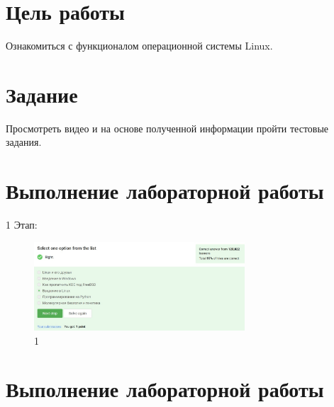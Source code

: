 \hypertarget{ux446ux435ux43bux44c-ux440ux430ux431ux43eux442ux44b}{%
\section{Цель
работы}\label{ux446ux435ux43bux44c-ux440ux430ux431ux43eux442ux44b}}

Ознакомиться с функционалом операционной системы Linux.

\hypertarget{ux437ux430ux434ux430ux43dux438ux435}{%
\section{Задание}\label{ux437ux430ux434ux430ux43dux438ux435}}

Просмотреть видео и на основе полученной информации пройти тестовые
задания.

\hypertarget{ux432ux44bux43fux43eux43bux43dux435ux43dux438ux435-ux43bux430ux431ux43eux440ux430ux442ux43eux440ux43dux43eux439-ux440ux430ux431ux43eux442ux44b}{%
\section{Выполнение лабораторной
работы}\label{ux432ux44bux43fux43eux43bux43dux435ux43dux438ux435-ux43bux430ux431ux43eux440ux430ux442ux43eux440ux43dux43eux439-ux440ux430ux431ux43eux442ux44b}}

1 Этап:

\begin{figure}
\hypertarget{fig:001}{%
\centering
\includegraphics[width=0.7\textwidth,height=\textheight]{image/1.png}
\caption{1}\label{fig:001}
}
\end{figure}

\hypertarget{ux432ux44bux43fux43eux43bux43dux435ux43dux438ux435-ux43bux430ux431ux43eux440ux430ux442ux43eux440ux43dux43eux439-ux440ux430ux431ux43eux442ux44b-1}{%
\section{Выполнение лабораторной
работы}\label{ux432ux44bux43fux43eux43bux43dux435ux43dux438ux435-ux43bux430ux431ux43eux440ux430ux442ux43eux440ux43dux43eux439-ux440ux430ux431ux43eux442ux44b-1}}

